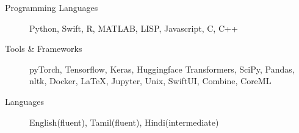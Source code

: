 \begin{description}
\item[Programming Languages] Python, Swift, R, MATLAB, LISP, Javascript, C, C++

\item[Tools \& Frameworks] pyTorch, Tensorflow, Keras, Huggingface Transformers, SciPy, Pandas, nltk, Docker, \LaTeX, Jupyter, Unix, SwiftUI, Combine, CoreML

\item[Languages] English(fluent), Tamil(fluent), Hindi(intermediate)
\end{description}
